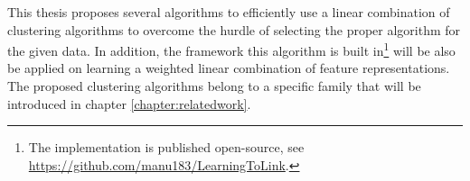 This thesis proposes several algorithms to efficiently use a linear combination of clustering algorithms to overcome the hurdle of selecting the proper algorithm for the given data. In addition, the framework this algorithm is built in\footnote{The implementation is published open-source, see \url{https://github.com/manu183/LearningToLink}.} will be also be applied on learning a weighted linear combination of feature representations. The proposed clustering algorithms belong to a specific family that will be introduced in chapter \ref{chapter:relatedwork}.